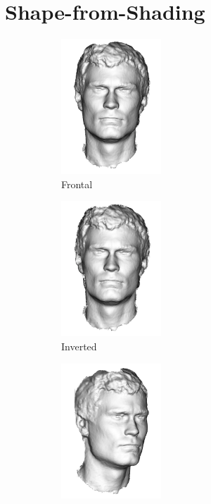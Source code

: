\section{Shape-from-Shading}\label{sec:bg_sfs}
\begin{figure}[t]
	\centering
	\begin{subfigure}[b]{0.24\textwidth}
		\centering
		\includegraphics[height=2in]{background/images/frontal}
		\caption*{Frontal}
	\end{subfigure}
	\begin{subfigure}[b]{0.24\textwidth}
		\centering
		\includegraphics[height=2in]{background/images/invert}
		\caption*{Inverted}
	\end{subfigure}
	\begin{subfigure}[b]{0.24\textwidth}
		\centering
		\includegraphics[height=2in]{background/images/frontal_rotate}

\end{subfigure}
\end{figure}
